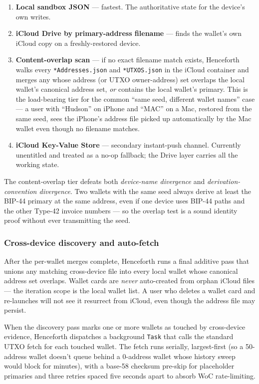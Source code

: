\documentclass[a4paper, 11pt, openany]{book}
\begin{document}
\begin{enumerate}
\item \textbf{Local sandbox JSON} --- fastest. The authoritative state for the device's own writes.
\item \textbf{iCloud Drive by primary-address filename} --- finds the wallet's own iCloud copy on a freshly-restored device.
\item \textbf{Content-overlap scan} --- if no exact filename match exists, Henceforth walks every \texttt{*Addresses.json} and \texttt{*UTXOS.json} in the iCloud container and merges any whose address (or UTXO owner-address) set overlaps the local wallet's canonical address set, \emph{or} contains the local wallet's primary. This is the load-bearing tier for the common ``same seed, different wallet names'' case --- a user with ``Hudson'' on iPhone and ``MAC'' on a Mac, restored from the same seed, sees the iPhone's address file picked up automatically by the Mac wallet even though no filename matches.
\item \textbf{iCloud Key-Value Store} --- secondary instant-push channel. Currently unentitled and treated as a no-op fallback; the Drive layer carries all the working state.
\end{enumerate}

The content-overlap tier defeats both \emph{device-name divergence} and \emph{derivation-convention divergence}. Two wallets with the same seed always derive at least the BIP-44 primary at the same address, even if one device uses BIP-44 paths and the other Type-42 invoice numbers --- so the overlap test is a sound identity proof without ever transmitting the seed.

\subsubsection*{Cross-device discovery and auto-fetch}

After the per-wallet merges complete, Henceforth runs a final additive pass that unions any matching cross-device file into every local wallet whose canonical address set overlaps. Wallet cards are \emph{never} auto-created from orphan iCloud files --- the iteration scope is the local wallet list. A user who deletes a wallet card and re-launches will not see it resurrect from iCloud, even though the address file may persist.

When the discovery pass marks one or more wallets as touched by cross-device evidence, Henceforth dispatches a background \texttt{Task} that calls the standard UTXO fetch for each touched wallet. The fetch runs serially, largest-first (so a 50-address wallet doesn't queue behind a 0-address wallet whose history sweep would block for minutes), with a base-58 checksum pre-skip for placeholder primaries and three retries spaced five seconds apart to absorb WoC rate-limiting.
\end{document}

